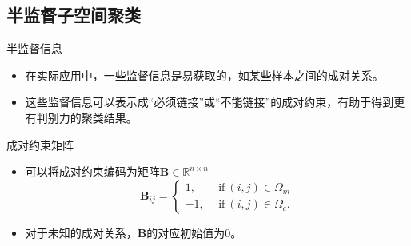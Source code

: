 \documentclass{beamer}
\begin{document}
\subsection{半监督子空间聚类}

\begin{frame}{半监督信息}

    \vspace{-0.8cm}
    \begin{figure}[!t]
		\label{fig_data}
	\end{figure}

    \begin{itemize}
        
        \item 在实际应用中，一些监督信息是易获取的，如某些样本之间的成对关系。
        
        \item 这些监督信息可以表示成“必须链接”或“不能链接”的成对约束，有助于得到更有判别力的聚类结果。
 
    \end{itemize}

\end{frame}

\begin{frame}{成对约束矩阵}

    \begin{itemize}
        
        \item 可以将成对约束编码为矩阵$\mathbf{B}\in\mathbb{R}^{n\times n}$
    	\begin{equation}
    		\mathbf{B}_{ij}=\left\{\begin{aligned}
    			1, &~~\text{if}~(i, j) \in \Omega_{m} \\
    			-1, &~~\text{if}~(i, j) \in \Omega_{c}.
    		\end{aligned}\right.
    	\end{equation}
    	
        \item 对于未知的成对关系，$\mathbf{B}$的对应初始值为0。
        
 
    \end{itemize}

\end{frame}
\end{document}
